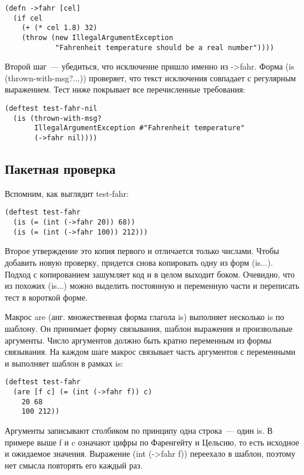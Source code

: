 \begin{verbatim}
(defn ->fahr [cel]
  (if cel
    (+ (* cel 1.8) 32)
    (throw (new IllegalArgumentException
            "Fahrenheit temperature should be a real number"))))
\end{verbatim}

Второй шаг~--- убедиться, что исключение пришло именно из ->fahr. Форма (is
(thrown-with-msg?...)) проверяет, что текст исключения совпадает с регулярным
выражением. Тест ниже покрывает все перечисленные требования:

\begin{verbatim}
(deftest test-fahr-nil
  (is (thrown-with-msg?
       IllegalArgumentException #"Fahrenheit temperature"
       (->fahr nil))))
\end{verbatim}

\subsection{Пакетная проверка}

Вспомним, как выглядит test-fahr:

\begin{verbatim}
(deftest test-fahr
  (is (= (int (->fahr 20)) 68))
  (is (= (int (->fahr 100)) 212)))
\end{verbatim}

Второе утверждение это копия первого и отличается только числами. Чтобы добавить
новую проверку, придется снова копировать одну из форм (is...). Подход с
копированием зашумляет код и в целом выходит боком. Очевидно, что из похожих
(is...) можно выделить постоянную и переменную части и переписать тест в
короткой форме.

Макрос are (анг. множественная форма глагола is) выполняет несколько is по
шаблону. Он принимает форму связывания, шаблон выражения и произвольные
аргументы. Число аргументов должно быть кратно переменным из формы
связывания. На каждом шаге макрос связывает часть аргументов с переменными и
выполняет шаблон в рамках is:

\begin{verbatim}
(deftest test-fahr
  (are [f c] (= (int (->fahr f)) c)
    20 68
    100 212))
\end{verbatim}

Аргументы записывают столбиком по принципу одна строка~--- один is. В примере выше
f и c означают цифры по Фаренгейту и Цельсию, то есть исходное и ожидаемое
значения. Выражение (int (->fahr f)) переехало в шаблон, поэтому нет смысла
повторять его каждый раз.

